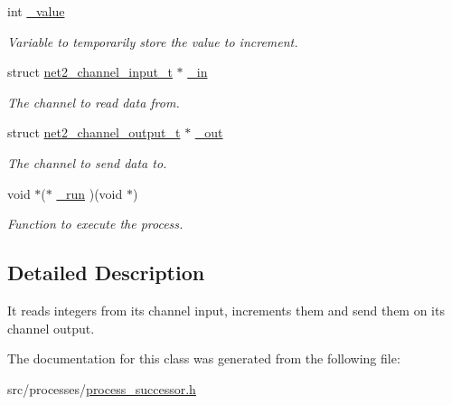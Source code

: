 \begin{DoxyCompactItemize}
\item 
\hypertarget{structprocess__successor__int__t_adab1d50bdaa98b5276673cb49b612fde}{}int \hyperlink{structprocess__successor__int__t_adab1d50bdaa98b5276673cb49b612fde}{\+\_\+value}\label{structprocess__successor__int__t_adab1d50bdaa98b5276673cb49b612fde}

\begin{DoxyCompactList}\small\item\em Variable to temporarily store the value to increment. \end{DoxyCompactList}\item 
\hypertarget{structprocess__successor__int__t_a728f7ed017c840f1fe227adbc7df3c89}{}struct \hyperlink{structnet2__channel__input__t}{net2\+\_\+channel\+\_\+input\+\_\+t} $\ast$ \hyperlink{structprocess__successor__int__t_a728f7ed017c840f1fe227adbc7df3c89}{\+\_\+in}\label{structprocess__successor__int__t_a728f7ed017c840f1fe227adbc7df3c89}

\begin{DoxyCompactList}\small\item\em The channel to read data from. \end{DoxyCompactList}\item 
\hypertarget{structprocess__successor__int__t_aff6997851f624dd26fe8ba56bfae2fd1}{}struct \hyperlink{structnet2__channel__output__t}{net2\+\_\+channel\+\_\+output\+\_\+t} $\ast$ \hyperlink{structprocess__successor__int__t_aff6997851f624dd26fe8ba56bfae2fd1}{\+\_\+out}\label{structprocess__successor__int__t_aff6997851f624dd26fe8ba56bfae2fd1}

\begin{DoxyCompactList}\small\item\em The channel to send data to. \end{DoxyCompactList}\item 
\hypertarget{structprocess__successor__int__t_aa6124bd1cdfbbe37a7201b903eb85599}{}void $\ast$($\ast$ \hyperlink{structprocess__successor__int__t_aa6124bd1cdfbbe37a7201b903eb85599}{\+\_\+run} )(void $\ast$)\label{structprocess__successor__int__t_aa6124bd1cdfbbe37a7201b903eb85599}

\begin{DoxyCompactList}\small\item\em Function to execute the process. \end{DoxyCompactList}\end{DoxyCompactItemize}


\subsection{Detailed Description}
It reads integers from its channel input, increments them and send them on its channel output. 

The documentation for this class was generated from the following file\+:\begin{DoxyCompactItemize}
\item 
src/processes/\hyperlink{process__successor_8h}{process\+\_\+successor.\+h}\end{DoxyCompactItemize}
